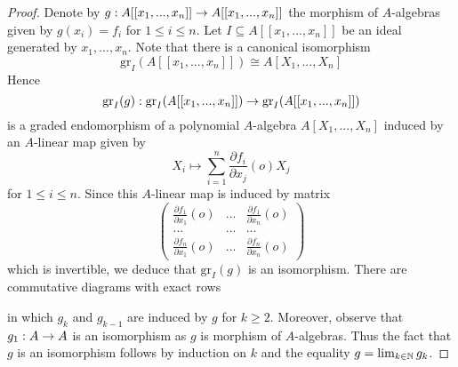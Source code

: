 \begin{proof}
Denote by $g:A[[x_1,...,x_n]]\rightarrow A[[x_1,...,x_n]]$ the morphism of $A$-algebras given by $g(x_i) = f_i$ for $1\leq i\leq n$. Let $I\subseteq A[[x_1,...,x_n]]$ be an ideal generated by $x_1,...,x_n$. Note that there is a canonical isomorphism
$$\mathrm{gr}_{I}(A[[x_1,...,x_n]]) \cong A[X_1,...,X_n]$$
Hence
$$\mathrm{gr}_{I}(g):\mathrm{gr}_{I}(A[[x_1,...,x_n]])\rightarrow \mathrm{gr}_{I}(A[[x_1,...,x_n]])$$
is a graded endomorphism of a polynomial $A$-algebra $A[X_1,...,X_n]$ induced by an $A$-linear map given by
$$X_i \mapsto \sum^n_{i=1}\frac{\partial f_i}{\partial x_j}(o)X_j$$
for $1\leq i\leq n$. Since this $A$-linear map is induced by matrix
$$\left( \begin{array}{ccc}
\frac{\partial f_1}{\partial x_1}(o) & ... & \frac{\partial f_1}{\partial x_n}(o) \\
... &...  &...  \\
\frac{\partial f_n}{\partial x_1}(o) &...  & \frac{\partial f_n }{\partial x_n}(o)\end{array} \right)$$
which is invertible, we deduce that $\mathrm{gr}_{I}(g)$ is an isomorphism. There are commutative diagrams with exact rows
\begin{center}
\end{center}
in which $g_k$ and $g_{k-1}$ are induced by $g$ for $k\geq 2$. Moreover, observe that $g_1:A\rightarrow A$ is an isomorphism as $g$ is morphism of $A$-algebras. Thus the fact that $g$ is an isomorphism follows by induction on $k$ and the equality $g = \lim_{k\in {\mathbb N}}g_k$.
\end{proof}


